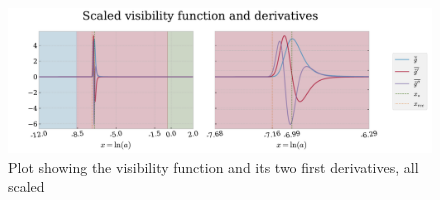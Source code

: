 \documentclass[10pt,a4paper]{article}
\begin{document}
\begin{figure}[ht]
    \centering
    \includegraphics[scale=0.5]{../figs/visibility_functions.pdf}
    \caption{Plot showing the visibility function and its two first derivatives, all scaled}
    \label{fig:g}
\end{figure}

\pagebreak


\end{document}
